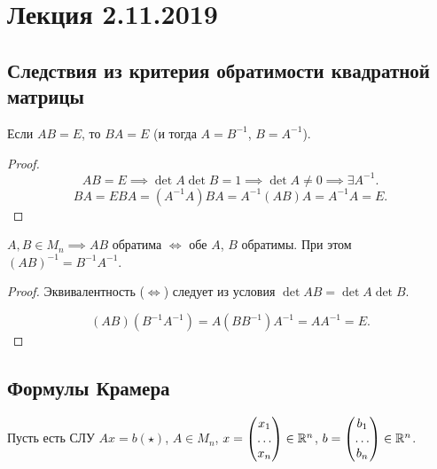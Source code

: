 \section{Лекция 2.11.2019}


\subsection{Следствия из критерия обратимости квадратной матрицы}

\begin{corollary}
    Если $AB = E$, то $BA = E$ (и тогда $A = B^{-1}$, $B = A^{-1}$).
\end{corollary}

\begin{proof}
    \begin{equation*}
        AB = E \implies \det A \det B = 1 \implies \det A \neq 0 \implies \exists A^{-1}
    .\end{equation*}
    \begin{equation*}
        BA = EBA = (A^{-1}A)BA = A^{-1}(AB)A = A^{-1}A = E
    .\end{equation*}
\end{proof}

\begin{corollary}
    $A, B \in M_n \implies AB$ обратима $\iff$ обе $A$, $B$ обратимы. При этом $(AB)^{-1} = B^{-1} A^{-1}$.
\end{corollary}

\begin{proof}
    Эквивалентность ($\iff$) следует из условия $\det AB = \det A \det B$.

    \begin{equation*}
        (AB)(B^{-1}A^{-1}) = A(BB^{-1})A^{-1} = A A^{-1} = E
    .\end{equation*}
\end{proof}

\subsection{Формулы Крамера}

Пусть есть СЛУ $Ax = b (\star)$, $A \in M_n$, $x = \begin{pmatrix} x_1 \\ \dots \\ x_n \end{pmatrix} \in \mathbb{R}^n$, $b = \begin{pmatrix} b_1 \\ \dots \\ b_n \end{pmatrix} \in \mathbb{R}^n$.

